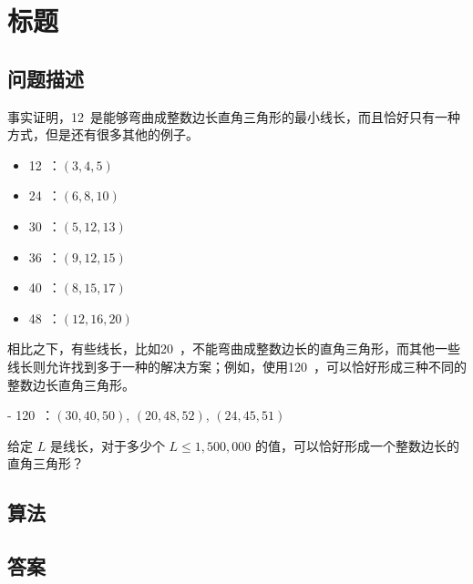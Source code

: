 \section{标题}
\subsection{问题描述}
\begin{tcolorbox}
	事实证明，12\,  是能够弯曲成整数边长直角三角形的最小线长，而且恰好只有一种方式，但是还有很多其他的例子。

	\begin{itemize}[itemsep=0pt]
		\item  12\, ：\((3, 4, 5)\)
		\item  24\, ：\((6, 8, 10)\)
		\item  30\, ：\((5, 12, 13)\)
		\item  36\, ：\((9, 12, 15)\)
		\item  40\, ：\((8, 15, 17)\)
		\item  48\, ：\((12, 16, 20)\)
	\end{itemize}

	相比之下，有些线长，比如20\, ，不能弯曲成整数边长的直角三角形，而其他一些线长则允许找到多于一种的解决方案；例如，使用120\, ，可以恰好形成三种不同的整数边长直角三角形。

	- 120\, ：\((30, 40, 50)\), \((20, 48, 52)\), \((24, 45, 51)\)

	给定 \( L \) 是线长，对于多少个 \( L \leq 1,500,000 \) 的值，可以恰好形成一个整数边长的直角三角形？

\end{tcolorbox}

\subsection{算法}

\subsection{答案}
